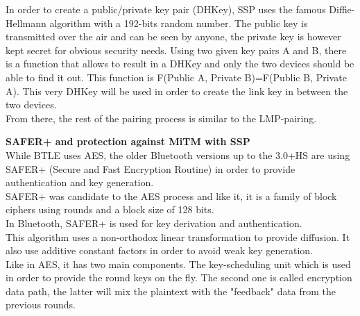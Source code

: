 In order to create a public/private key pair (DHKey), SSP uses the famous Diffie-Hellmann algorithm with a 192-bits random number. The public key is transmitted over the air and can be seen by anyone, the private key is however kept secret for obvious security needs. 
Using two given key pairs A and B, there is a function that allows to result in a DHKey and only the two devices should be able to find it out. This function is F(Public A, Private B)=F(Public B, Private A). This very DHKey will be used in order to create the link key in between the two devices. \\ 
From there, the rest of the pairing process is similar to the LMP-pairing.

\newpage
\textbf{SAFER+ and protection against MiTM with SSP}\\

While BTLE uses AES, the older Bluetooth versions up to the 3.0+HS are using SAFER+ (Secure and Fast Encryption Routine) in order to provide authentication and key generation.\\
SAFER+ was candidate to the AES process and like it, it is a family of block ciphers using rounds and a block size of 128 bits.\\
In Bluetooth, SAFER+ is used for key derivation and authentication.\\
This algorithm uses a non-orthodox linear transformation to provide diffusion. It also use additive constant factors in order to avoid weak key generation.\\
Like in AES, it has two main components. The key-scheduling unit which is used in order to provide the round keys on the fly. The second one is called encryption data path, the latter will mix the plaintext with the "feedback" data from the previous rounds.\\


